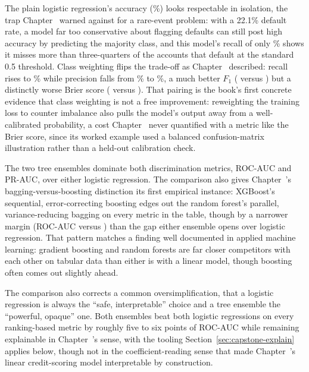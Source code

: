 \documentclass[../ai_in_finance]{subfiles}
\begin{document}
The plain logistic regression's accuracy (\vChTwentyOneBakeLRPlainAccPct\%) looks respectable in isolation, the trap Chapter~ warned against for a rare-event problem: with a 22.1\% default rate, a model far too conservative about flagging defaults can still post high accuracy by predicting the majority class, and this model's recall of only \vChTwentyOneBakeLRPlainRecPct\% shows it misses more than three-quarters of the accounts that default at the standard 0.5 threshold. Class weighting flips the trade-off as Chapter~ described: recall rises to \vChTwentyOneBakeLRBalRecPct\% while precision falls from \vChTwentyOneBakeLRPlainPrecPct\% to \vChTwentyOneBakeLRBalPrecPct\%, a much better $F_1$ (\vChTwentyOneBakeLRBalFone{} versus \vChTwentyOneBakeLRPlainFone) but a distinctly worse Brier score (\vChTwentyOneBakeLRBalBrier{} versus \vChTwentyOneBakeLRPlainBrier). That pairing is the book's first concrete evidence that class weighting is not a free improvement: reweighting the training loss to counter imbalance also pulls the model's output away from a well-calibrated probability, a cost Chapter~ never quantified with a metric like the Brier score, since its worked example used a balanced confusion-matrix illustration rather than a held-out calibration check.

The two tree ensembles dominate both discrimination metrics, ROC-AUC and PR-AUC, over either logistic regression. The comparison also gives Chapter~'s bagging-versus-boosting distinction its first empirical instance: XGBoost's sequential, error-correcting boosting edges out the random forest's parallel, variance-reducing bagging on every metric in the table, though by a narrower margin (ROC-AUC \vChTwentyOneBakeXGBROCAUC{} versus \vChTwentyOneBakeRFROCAUC) than the gap either ensemble opens over logistic regression. That pattern matches a finding well documented in applied machine learning: gradient boosting and random forests are far closer competitors with each other on tabular data than either is with a linear model, though boosting often comes out slightly ahead.

The comparison also corrects a common oversimplification, that a logistic regression is always the ``safe, interpretable'' choice and a tree ensemble the ``powerful, opaque'' one. Both ensembles beat both logistic regressions on every ranking-based metric by roughly five to six points of ROC-AUC while remaining explainable in Chapter~'s sense, with the tooling Section~\ref{sec:capstone-explain} applies below, though not in the coefficient-reading sense that made Chapter~'s linear credit-scoring model interpretable by construction.
\end{document}
